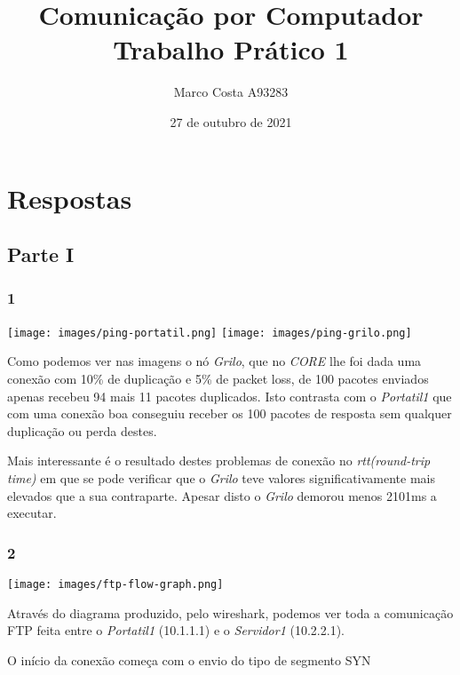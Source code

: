 \documentclass{article}
\title{
    Comunicação por Computador \\
    \large{Trabalho Prático 1}
}
\author{
    Marco Costa A93283
}
\date{27 de outubro de 2021}
\affil{
    Universidade do Minho
}
\begin{document}
        \maketitle
    \section*{Respostas}
        \subsection*{Parte I}
            \subsubsection*{1}
                {
                    \centering
                    \texttt{[image: images/ping-portatil.png]}
                    \texttt{[image: images/ping-grilo.png]}
                    \par
                }
                    Como podemos ver nas imagens o nó \textit{Grilo}, que no \textit{CORE} lhe foi dada
                uma conexão com 10\% de duplicação e 5\% de packet loss, de 100 pacotes enviados apenas recebeu
                94 mais 11 pacotes duplicados. Isto contrasta com o \textit{Portatil1} que com uma conexão boa conseguiu
                receber os 100 pacotes de resposta sem qualquer duplicação ou perda destes.\par

                    Mais interessante é o resultado destes problemas de conexão no \textit{rtt(round-trip time)} em que se pode verificar
                que o \textit{Grilo} teve valores significativamente mais elevados que a sua contraparte. Apesar disto o \textit{Grilo} demorou
                menos 2101ms a executar.
            \subsubsection*{2}
                {
                    \centering
                    \texttt{[image: images/ftp-flow-graph.png]}
                    \par
                }
                    Através do diagrama produzido, pelo wireshark, podemos ver toda a comunicação FTP feita entre o \textit{Portatil1} (10.1.1.1) e o \textit{Servidor1} (10.2.2.1).

		            O início da conexão começa com o envio do tipo de segmento SYN
\end{document}
